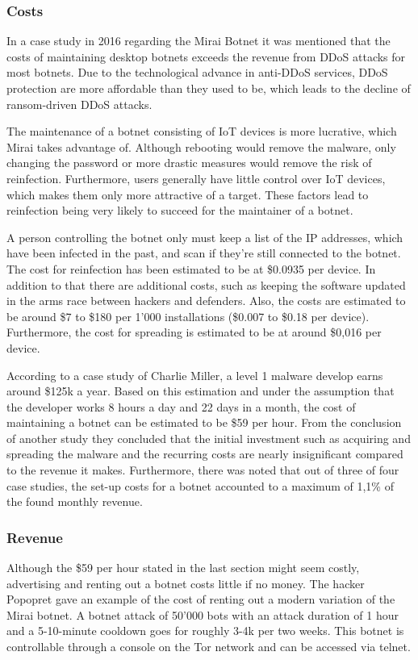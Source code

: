 	\subsubsection{Costs}
	In a case study in 2016 regarding the Mirai Botnet it was mentioned that the costs of maintaining desktop botnets exceeds the revenue from DDoS attacks for most botnets. Due to the technological advance in anti-DDoS services, DDoS protection are more affordable than they used to be, which leads to the decline of ransom-driven DDoS attacks.
	
The maintenance of a botnet consisting of IoT devices is more lucrative, which Mirai takes advantage of. Although rebooting would remove the malware, only changing the password or more drastic measures would remove the risk of reinfection. Furthermore, users generally have little control over IoT devices, which makes them only more attractive of a target. These factors lead to reinfection being very likely to succeed for the maintainer of a botnet.

A person controlling the botnet only must keep a list of the IP addresses, which have been infected in the past, and scan if they're still connected to the botnet. The cost for reinfection has been estimated to be at \$0.0935 per device. In addition to that there are additional costs, such as keeping the software updated in the arms race between hackers and defenders.
Also, the costs are estimated to be around \$7 to \$180 per 1'000 installations (\$0.007 to \$0.18 per device). Furthermore, the cost for spreading is estimated to be at around \$0,016 per device.

According to a case study of Charlie Miller, a level 1 malware develop earns around \$125k a year. Based on this estimation and under the assumption that the developer works 8 hours a day and 22 days in a month, the cost of maintaining a botnet can be estimated to be \$59 per hour.
From the conclusion of another study they concluded that the initial investment such as acquiring and spreading the malware and the recurring costs are nearly insignificant compared to the revenue it makes. Furthermore, there was noted that out of three of four case studies, the set-up costs for a botnet accounted to a maximum of 1,1\% of the found monthly revenue.

	\subsubsection{Revenue}
	Although the \$59 per hour stated in the last section might seem costly, advertising and renting out a botnet costs little if no money. The hacker Popopret gave an example of the cost of renting out a modern variation of the Mirai botnet. A botnet attack of 50'000 bots with an attack duration of 1 hour and a 5-10-minute cooldown goes for roughly 3-4k per two weeks. This botnet is controllable through a console on the Tor network and can be accessed via telnet.
	

